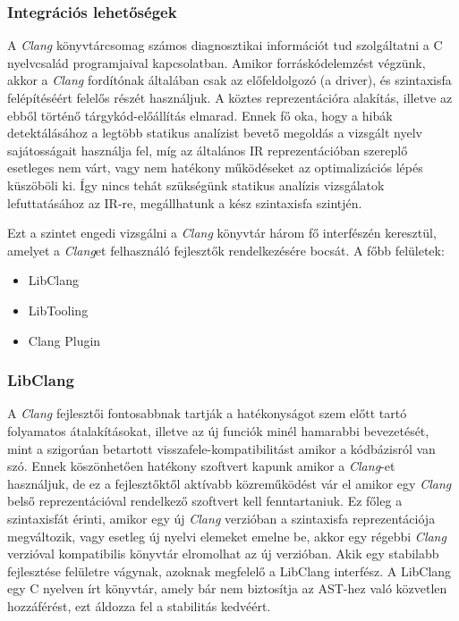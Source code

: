 \documentclass[a4paper,12pt]{report}
\begin{document}
\subsubsection{Integrációs lehetőségek}
A \emph{Clang} könyvtárcsomag számos diagnosztikai információt tud szolgáltatni a C nyelvcsalád programjaival kapcsolatban. Amikor forráskódelemzést végzünk, akkor a \emph{Clang} fordítónak általában csak az előfeldolgozó (a driver), és szintaxisfa felépítéséért felelős részét használjuk. A köztes reprezentációra alakítás, illetve az ebből történő tárgykód-előállítás elmarad. Ennek fő oka, hogy a hibák detektálásához a legtöbb statikus analízist bevető megoldás a vizsgált nyelv sajátosságait használja fel, míg az általános IR reprezentációban szereplő esetleges nem várt, vagy nem hatékony működéseket az optimalizációs lépés küszöböli ki. Így nincs tehát szükségünk statikus analízis vizsgálatok lefuttatásához az IR-re, megállhatunk a kész szintaxisfa szintjén.

Ezt a szintet engedi vizsgálni a \emph{Clang} könyvtár három fő interfészén keresztül, amelyet a \emph{Clang}et felhasználó fejlesztők rendelkezésére bocsát. A főbb felületek:
\begin{itemize}
\item LibClang
\item LibTooling
\item Clang Plugin
\end{itemize}

\subsubsection{LibClang}
A \emph{Clang} fejlesztői fontosabbnak tartják a hatékonyságot szem előtt tartó folyamatos átalakításokat, illetve az új funciók minél hamarabbi bevezetését, mint a szigorúan betartott visszafele-kompatibilitást amikor a kódbázisról van szó. Ennek köszönhetően hatékony szoftvert kapunk amikor a \emph{Clang}-et használjuk, de ez a fejlesztőktől aktívabb közreműködést vár el amikor egy \emph{Clang} belső reprezentációval rendelkező szoftvert kell fenntartaniuk. Ez főleg a szintaxisfát érinti, amikor egy új \emph{Clang} verzióban a szintaxisfa reprezentációja megváltozik, vagy esetleg új nyelvi elemeket emelne be, akkor egy régebbi \emph{Clang} verzióval kompatibilis könyvtár elromolhat az új verzióban. Akik egy stabilabb fejlesztése felületre vágynak, azoknak megfelelő a LibClang interfész. A LibClang egy C nyelven írt könyvtár, amely bár nem biztosítja az AST-hez való közvetlen  hozzáférést, ezt áldozza fel a stabilitás kedvéért.
\end{document}
